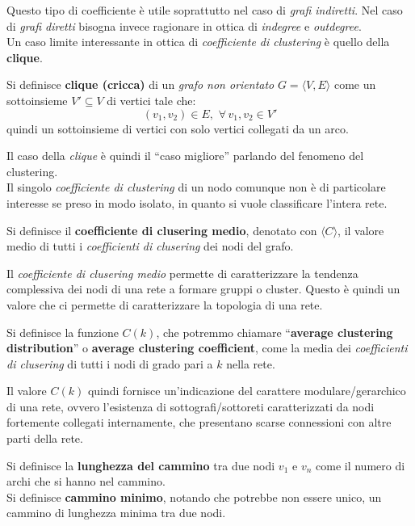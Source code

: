 \documentclass[a4paper,12pt, oneside]{book}
\begin{document}
Questo tipo di coefficiente è utile soprattutto nel caso di \textit{grafi
  indiretti}. Nel caso di \textit{grafi diretti} bisogna invece ragionare in
ottica di \textit{indegree} e \textit{outdegree}.\\
Un caso limite interessante in ottica di \textit{coefficiente di clustering} è
quello della \textbf{clique}.
\begin{definizione}
  Si definisce \textbf{clique (\textup{cricca})} di un \textit{grafo non
    orientato}
  $G=\langle V,E\rangle$ come un sottoinsieme $V'\subseteq V$ di vertici tale
  che: 
  \[(v_1,v_2)\in E,\,\,\forall \,v_1,v_2\in V'\]
  quindi un sottoinsieme di vertici con solo vertici collegati da un arco.
\end{definizione}
Il caso della \textit{clique} è quindi il ``caso migliore'' parlando del
fenomeno del clustering.\\
Il singolo \textit{coefficiente di clustering} di un nodo comunque non è di
particolare interesse se preso in modo isolato, in quanto si vuole classificare
l'intera rete.
\begin{definizione}
  Si definisce il \textbf{coefficiente di clusering medio}, denotato con
  $\langle C\rangle$, il valore medio di tutti i \textit{coefficienti di
    clusering} dei nodi del grafo.
\end{definizione}
Il \textit{coefficiente di clusering medio} permette di caratterizzare la
tendenza complessiva dei nodi di una rete a formare gruppi o cluster. Questo è
quindi un valore che ci permette di caratterizzare la topologia di una rete.
\begin{definizione}
  Si definisce la funzione $C(k)$, che potremmo chiamare ``\textbf{average
    clustering distribution}'' o \textbf{average clustering coefficient}, come
  la media dei \textit{coefficienti di 
    clusering} di tutti i nodi di grado pari a $k$ nella rete.
\end{definizione}
Il valore $C(k)$ quindi fornisce un'indicazione del carattere
modulare/gerarchico di una rete, ovvero l'esistenza di sottografi/sottoreti
caratterizzati da nodi fortemente collegati internamente, che presentano scarse
connessioni con altre parti della rete.
\begin{definizione}
  Si definisce la \textbf{lunghezza del cammino} tra due nodi $v_1$ e $v_n$ come
  il numero di archi che si hanno nel cammino.\\
  Si definisce \textbf{cammino minimo}, notando che potrebbe non essere unico,
  un cammino di lunghezza minima tra due nodi. 
\end{definizione}
\end{document}
